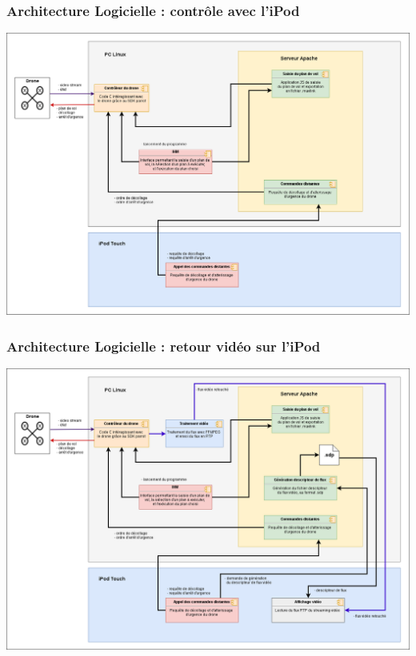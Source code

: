 \documentclass{beamer}
\begin{document}

	\begin{frame}
		\begin{center}
		\frametitle{Architecture Logicielle : contrôle avec l'iPod}

       
        \includegraphics[scale=0.24]{03_archi_logicielle_iPod.png}
		\end{center}
	\end{frame}



	\begin{frame}
		\begin{center}
		\frametitle{Architecture Logicielle : retour vidéo sur l'iPod}

       
        \includegraphics[scale=0.24]{04_archi_logicielle_complete.png}
		\end{center}
	\end{frame}
	
\end{document}
